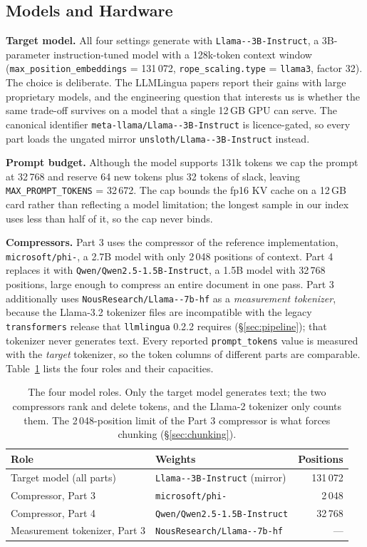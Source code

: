 ﻿\documentclass[10pt,a4paper,twocolumn]{article}
\newcommand{\Llama}{\texttt{Llama-\allowbreak 3.2-\allowbreak 3B-\allowbreak Instruct}}
\newcommand{\LlamaGated}{\texttt{meta-llama/\allowbreak Llama-\allowbreak 3.2-\allowbreak 3B-\allowbreak Instruct}}
\newcommand{\LlamaMirror}{\texttt{unsloth/\allowbreak Llama-\allowbreak 3.2-\allowbreak 3B-\allowbreak Instruct}}
\newcommand{\PhiTwo}{\texttt{microsoft/\allowbreak phi-\allowbreak 2}}
\newcommand{\QwenOne}{\texttt{Qwen/}\allowbreak\texttt{Qwen2.5-\allowbreak 1.5B-\allowbreak Instruct}}
\newcommand{\LlamaTwoTok}{\texttt{NousResearch/\allowbreak Llama-\allowbreak 2-\allowbreak 7b-\allowbreak hf}}
\begin{document}
\subsection{Models and Hardware}
\label{sec:models}

\textbf{Target model.} All four settings generate with \Llama{}, a 3B-parameter
instruction-tuned model with a 128k-token context window
(\texttt{max\_position\_embeddings} = 131\,072,
\texttt{rope\_scaling.type} = \texttt{llama3}, factor 32). The choice is
deliberate. The LLMLingua papers report their gains with large proprietary
models, and the engineering question that interests us is whether the same
trade-off survives on a model that a single 12\,GB GPU can serve. The canonical
identifier \LlamaGated{} is licence-gated, so every part loads the
ungated mirror \LlamaMirror{} instead.

\textbf{Prompt budget.} Although the model supports 131k tokens we cap the prompt
at 32\,768 and reserve 64 new tokens plus 32 tokens of slack, leaving
\texttt{MAX\_PROMPT\_TOKENS} = 32\,672. The cap bounds the fp16 KV cache on a
12\,GB card rather than reflecting a model limitation; the longest sample in our
index uses less than half of it, so the cap never binds.

\textbf{Compressors.} Part 3 uses the compressor of the reference
implementation, \PhiTwo{}, a 2.7B model with only 2\,048 positions of context.
Part 4 replaces it with \QwenOne{}, a 1.5B model with 32\,768 positions, large
enough to compress an entire document in one pass. Part 3 additionally uses
\LlamaTwoTok{} as a \emph{measurement tokenizer}, because the Llama-3.2 tokenizer
files are incompatible with the legacy \texttt{transformers} release that
\texttt{llmlingua} 0.2.2 requires (\S\ref{sec:pipeline}); that tokenizer never
generates text. Every reported \texttt{prompt\_tokens} value is measured with the
\emph{target} tokenizer, so the token columns of different parts are comparable.
Table~\ref{tab:roles} lists the four roles and their capacities.

\begin{table}[t]
\centering
\footnotesize
\begin{tabularx}{\columnwidth}{@{}lXr@{}}
\toprule
Role & Weights & Positions \\
\midrule
Target model (all parts)      & \Llama{} (mirror)        & 131\,072 \\
Compressor, Part 3            & \PhiTwo{}                & 2\,048 \\
Compressor, Part 4            & \QwenOne{}               & 32\,768 \\
Measurement tokenizer, Part 3 & \LlamaTwoTok{}           & --- \\
\bottomrule
\end{tabularx}
\caption{The four model roles. Only the target model generates text; the two
compressors rank and delete tokens, and the Llama-2 tokenizer only counts them.
The 2\,048-position limit of the Part 3 compressor is what forces chunking
(\S\ref{sec:chunking}).}
\label{tab:roles}
\end{table}
\end{document}
